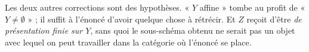 \documentclass[11pt,a4paper]{article}
\begin{document}
Les deux autres corrections sont des hypothèses. « $Y$ affine » tombe au profit
de « $Y \neq \emptyset$ » ; il suffit à l'énoncé d'avoir
quelque chose à rétrécir. Et $Z$ reçoit d'être \emph{de présentation finie sur
$Y$}, sans quoi le sous-schéma obtenu ne serait pas un objet avec lequel on
peut travailler dans la catégorie où l'énoncé se place.
\end{document}
